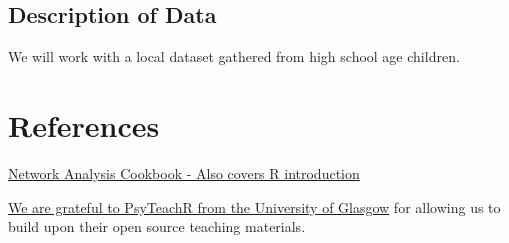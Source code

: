 \documentclass[]{book}
\begin{document}
\section{Description of Data}\label{description-of-data}

We will work with a local dataset gathered from high school age
children.

\appendix


\chapter{References}\label{references}

\href{http://sachaepskamp.com/files/Cookbook.html}{Network Analysis
Cookbook - Also covers R introduction}

\href{https://psyteachr.github.io/}{We are grateful to PsyTeachR from
the University of Glasgow} for allowing us to build upon their open
source teaching materials.


\end{document}
